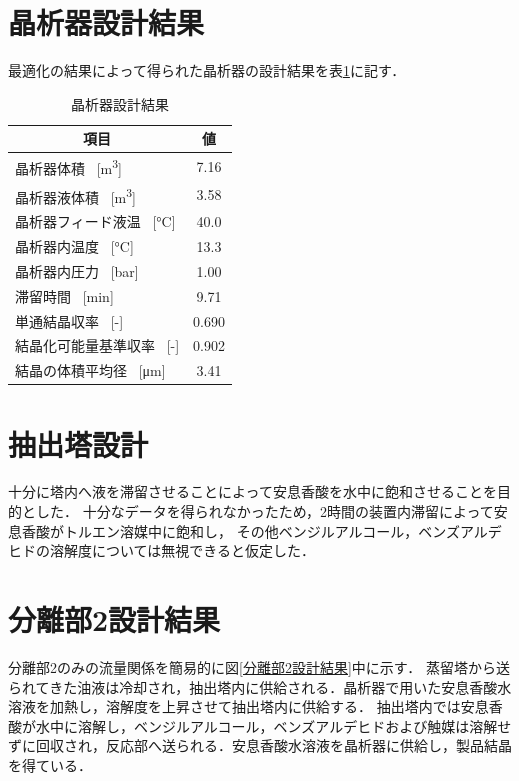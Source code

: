 \documentclass[a4j]{jsreport}
\begin{document}
\section{晶析器設計結果}
最適化の結果によって得られた晶析器の設計結果を表\ref{晶析器設計結果}に記す．
\begin{table}[htbp]
    \caption{晶析器設計結果}
    \label{晶析器設計結果}
    \begin{center}
        \begin{tabular}{lc}\hline
            \multicolumn{1}{c}{項目}       &  値    \\   \hline
            晶析器体積 \, [\si{\cubic \metre}]                 &7.16    \\
            晶析器液体積 \, [\si{\cubic \metre}]                &3.58    \\
            晶析器フィード液温 \, [\si{\degreeCelsius}]   &40.0    \\
            晶析器内温度 \, [\si{\degreeCelsius}]         &13.3   \\
            晶析器内圧力 \, [\si{bar}]               &1.00    \\
            滞留時間 \, [\si{min}]                    &9.71    \\
            単通結晶収率 \, [\si{-}]               &0.690   \\
            結晶化可能量基準収率 \, [\si{-}]        &0.902    \\
            結晶の体積平均径 \, [\si{\micro \metre}]      &3.41     \\ \hline
        \end{tabular}
    \end{center}
\end{table}

\section{抽出塔設計}
十分に塔内へ液を滞留させることによって安息香酸を水中に飽和させることを目的とした．
十分なデータを得られなかったため，2時間の装置内滞留によって安息香酸がトルエン溶媒中に飽和し，
その他ベンジルアルコール，ベンズアルデヒドの溶解度については無視できると仮定した．

\section{分離部2設計結果}
分離部2のみの流量関係を簡易的に図\ref{分離部2設計結果}中に示す．
蒸留塔から送られてきた油液は冷却され，抽出塔内に供給される．晶析器で用いた安息香酸水溶液を加熱し，溶解度を上昇させて抽出塔内に供給する．
抽出塔内では安息香酸が水中に溶解し，ベンジルアルコール，ベンズアルデヒドおよび触媒は溶解せずに回収され，反応部へ送られる．安息香酸水溶液を晶析器に供給し，製品結晶を得ている．
\end{document}
